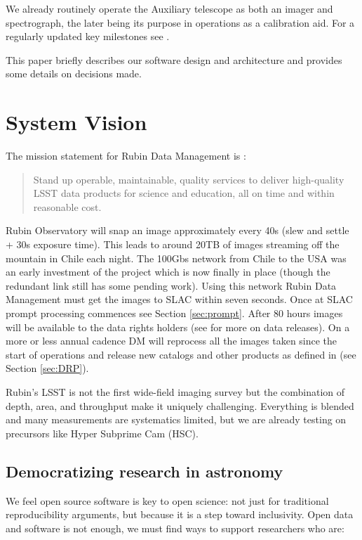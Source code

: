 \documentclass[11pt,twoside]{article}
\begin{document}
We already routinely operate the Auxiliary telescope as both an imager and spectrograph, the later being its purpose in operations as a calibration aid. For a regularly updated key milestones see \citep{DMTN-232}.

This paper briefly describes our software design and architecture and provides some details on decisions made.

\section{System Vision}
The mission statement for Rubin Data Management is :
\begin{quote}
Stand up operable, maintainable, quality services to deliver high-quality LSST data products for science and education, all on time and within reasonable cost.

\end{quote}

Rubin Observatory will snap an image approximately every 40s (slew and settle + 30s exposure time).
This leads to around 20TB of images streaming off the mountain in Chile each night.
The 100Gbs network from Chile to the USA was an early investment of the project which is now finally in place (though the redundant link still has some pending work).
Using this network Rubin Data Management must get the images to SLAC within seven seconds.
Once at SLAC prompt processing commences see Section \ref{sec:prompt}.
After 80 hours images will be available to the data rights holders (see \citep{RDO-011} for more on data releases).
On a more or less annual cadence DM will reprocess all the images taken since the start of operations and release new catalogs and other products as defined in \citet{LSE-163} (see Section \ref{sec:DRP}).

Rubin’s LSST is not the first wide-field imaging survey but the combination of depth, area, and throughput make it uniquely challenging.
Everything is blended and many measurements are systematics limited, but
we are already testing  on precursors like Hyper Subprime Cam (HSC).


\subsection{Democratizing research in astronomy}

We feel open source software is key to open science: not just for traditional reproducibility arguments, but because it is a step toward inclusivity.
Open data and software  is not enough, we must find ways to support researchers who are:
\end{document}
